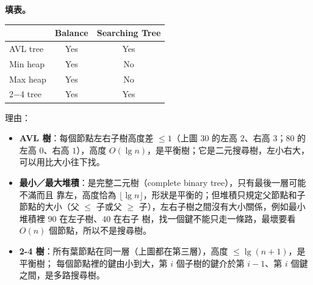 \begin{pastsoln}
\textbf{填表。}
\begin{center}
\begin{tabular}{|l|c|c|}
\hline
 & Balance & Searching Tree \\ \hline
AVL tree & Yes & Yes \\ \hline
Min heap & Yes & No \\ \hline
Max heap & Yes & No \\ \hline
2$-$4 tree & Yes & Yes \\ \hline
\end{tabular}
\end{center}
理由：
\begin{itemize}[nosep]
\item \textbf{AVL 樹}：每個節點左右子樹高度差 $\le 1$（上圖 $30$ 的左高 $2$、右高 $3$；$80$ 的
左高 $0$、右高 $1$），高度 $O(\lg n)$，是平衡樹；它是二元搜尋樹，左小右大，可以用比大小往下找。
\item \textbf{最小／最大堆積}：是完整二元樹（complete binary tree），只有最後一層可能不滿而且
靠左，高度恰為 $\lfloor \lg n \rfloor$，形狀是平衡的；但堆積只規定父節點和子節點的大小（父
$\le$ 子或父 $\ge$ 子），左右子樹之間沒有大小關係，例如最小堆積裡 $90$ 在左子樹、$40$ 在右子
樹，找一個鍵不能只走一條路，最壞要看 $O(n)$ 個節點，所以不是搜尋樹。
\item \textbf{2-4 樹}：所有葉節點在同一層（上圖都在第三層），高度 $\le \lg(n+1)$，是平衡樹；
每個節點裡的鍵由小到大，第 $i$ 個子樹的鍵介於第 $i-1$、第 $i$ 個鍵之間，是多路搜尋樹。
\end{itemize}
\end{pastsoln}

